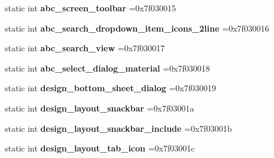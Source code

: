 \begin{DoxyCompactItemize}
static int {\bfseries abc\+\_\+screen\+\_\+toolbar} =0x7f030015
\item 
\mbox{\label{classandroid_1_1support_1_1v7_1_1cardview_1_1R_1_1layout_a5b7c9e756746e12e222586b380980acf}} 
static int {\bfseries abc\+\_\+search\+\_\+dropdown\+\_\+item\+\_\+icons\+\_\+2line} =0x7f030016
\item 
\mbox{\label{classandroid_1_1support_1_1v7_1_1cardview_1_1R_1_1layout_a31828dfa25d3b1ef4e0ec58535b5d79f}} 
static int {\bfseries abc\+\_\+search\+\_\+view} =0x7f030017
\item 
\mbox{\label{classandroid_1_1support_1_1v7_1_1cardview_1_1R_1_1layout_ac689e3e209426472eb722853f9918f49}} 
static int {\bfseries abc\+\_\+select\+\_\+dialog\+\_\+material} =0x7f030018
\item 
\mbox{\label{classandroid_1_1support_1_1v7_1_1cardview_1_1R_1_1layout_ae37334f3360e37fed72b8332deb8c3a9}} 
static int {\bfseries design\+\_\+bottom\+\_\+sheet\+\_\+dialog} =0x7f030019
\item 
\mbox{\label{classandroid_1_1support_1_1v7_1_1cardview_1_1R_1_1layout_ad06436b5e31d6ff17c2d30829a0c0821}} 
static int {\bfseries design\+\_\+layout\+\_\+snackbar} =0x7f03001a
\item 
\mbox{\label{classandroid_1_1support_1_1v7_1_1cardview_1_1R_1_1layout_a1f2932a12a7469e1bea4f6c648a5c47d}} 
static int {\bfseries design\+\_\+layout\+\_\+snackbar\+\_\+include} =0x7f03001b
\item 
\mbox{\label{classandroid_1_1support_1_1v7_1_1cardview_1_1R_1_1layout_a50fd442f204c601a573bdc7c4194bfd1}} 
static int {\bfseries design\+\_\+layout\+\_\+tab\+\_\+icon} =0x7f03001c
\item 
\mbox{\label{classandroid_1_1support_1_1v7_1_1cardview_1_1R_1_1layout_ae5ffa26ad1f7c261b61968e63a7cbf55}} 

\end{DoxyCompactItemize}
